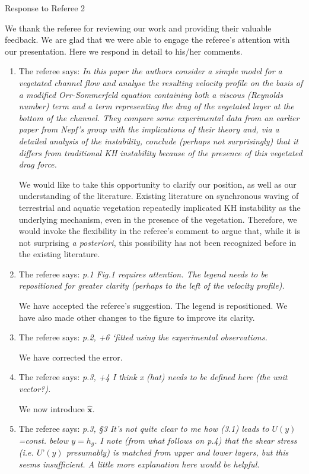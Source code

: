 \documentclass[letterpaper,10pt]{article}
\newcommand{\bx}{\mathbf{x}}
\begin{document}
\newpage
\centerline{Response to Referee 2}
We thank the referee for reviewing our work and providing their valuable feedback. 
We are glad that we were able to engage the referee's attention with our presentation.
Here we respond in detail to his/her comments.
\begin{enumerate}
\item The referee says:
\textit{
In this paper the authors consider a simple model for a vegetated channel flow and analyse the resulting velocity profile on the basis of a modified Orr-Sommerfeld equation containing both a viscous (Reynolds number) term and a term representing the drag of the vegetated layer at the bottom of the channel. They compare some experimental data from an earlier paper from Nepf’s group with the implications of their theory and, via a detailed analysis of the instability, conclude (perhaps not surprisingly) that it differs from traditional KH instability because of the presence of this vegetated drag force.
}

We would like to take this opportunity to clarify our position, as well as our understanding of the literature.
Existing literature on synchronous waving of terrestrial and aquatic vegetation repeatedly implicated KH instability as the underlying mechanism, even in the presence of the vegetation. 
Therefore, we would invoke the flexibility in the referee's comment to argue that, while it is not surprising \textit{a posteriori}, this possibility has not been recognized before in the existing literature.

\item The referee says:
\textit{p.1 Fig.1 requires attention. The legend needs to be repositioned for greater
clarity (perhaps to the left of the velocity profile).}

We have accepted the referee's suggestion. The legend is repositioned. We have also made other changes to the figure to improve its clarity.

\item The referee says:
\textit{
p.2, +6 ‘fitted using the experimental observations.
}

We have corrected the error.

\item The referee says:
\textit{
p.3, +4 I think x (hat) needs to be defined here (the unit vector?).
}

We now introduce $\hat{\bx}$.

\item The referee says:
\textit{
p.3, \S 3 It’s not quite clear to me how (3.1) leads to $U(y)$=const. below $y=h_g$. I note (from what follows on p.4) that the shear stress (i.e. $U’(y)$ presumably) is
matched from upper and lower layers, but this seems insufficient. A little more explanation here would be helpful.
}


\end{enumerate}
\end{document}
